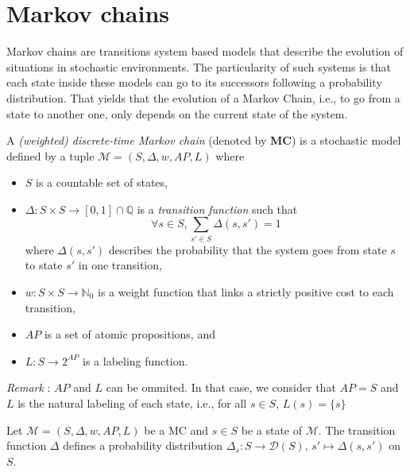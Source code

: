 \section{Markov chains}
Markov chains are transitions system based models that describe the evolution of situations in stochastic environments. The particularity of such systems is that each state inside these models can go to its successors following a probability distribution.
That yields that the evolution of a Markov Chain, i.e., to go from a state to another one, only depends on the current state of the system.
\begin{definition}
  A \textit{(weighted) discrete-time Markov chain} (denoted by \textbf{MC}) is a stochastic model defined by a tuple $\mathcal{M}=(S, \Delta, w, AP, L)$ where
	\begin{itemize}
		\item $S$ is a countable set of states,
		\item $\Delta: S \times S \rightarrow [0,1] \cap \mathbb{Q}$ is a  \textit{transition function} such that \[\forall s \in S, \sum_{s' \in S}\Delta(s, s')= 1\]
		where $\Delta(s, s')$ describes the probability that the system goes from state $s$ to state $s'$ in one transition,
    \item $w : S \times S \rightarrow \mathbb{N}_0$ %
      is a weight function that links a strictly positive cost to each transition,
    \item $AP$ is a set of atomic propositions, and
    \item $L : S \rightarrow 2^{AP}$ is a labeling function.
	\end{itemize}
  \textit{Remark }: $AP$ and $L$ can be ommited. In that case, we consider that $AP = S$ and $L$ is the natural labeling of each state, i.e., for all $s \in S$, $L(s) = \{s\}$
\end{definition}

\begin{property}
  Let $\mathcal{M} = (S, \Delta, w, AP, L)$ be a MC and $s \in S$ be a state of $\mathcal{M}$. The transition function $\Delta$ defines a probability distribution $\Delta_s : S \rightarrow \mathcal{D}(S), \, s' \mapsto \Delta(s, s')$ on $S$.
\end{property}

